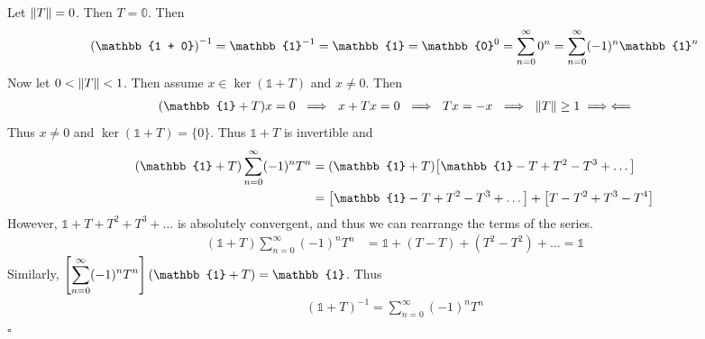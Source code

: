 \documentclass[12pt]{article}
\theoremstyle{plain}
\begin{document}
Let $\norm{T} = 0$.  Then $T = \mathbb{0}$.  Then
\begin{align*}
    \qty(\mathbb{1 + 0})^{-1} = \mathbb{1}^{-1} = \mathbb{1} = \mathbb{0}^0 = \sum_{n=0}^{\infty}0^n = \sum_{n=0}^\infty (-1)^n\mathbb{1}^n
\end{align*}
Now let $0 < \norm{T} < 1$.  Then assume $x \in \ker(\mathbb{1} + T)$ and $x \neq 0$.  Then
\begin{align*}
    (\mathbb{1} + T)x = 0\ \implies\ x + Tx = 0\ \implies\ Tx = -x\ \implies\ \norm{T} \geq 1 \implies\Longleftarrow
\end{align*}
Thus $x \neq 0$ and $\ker(\mathbb{1} + T) = \{0\}$.  Thus $\mathbb{1} + T$ is invertible and
\begin{align*}
    (\mathbb{1} + T)\sum_{n=0}^\infty(-1)^nT^n &= (\mathbb{1} + T)\qty[\mathbb{1} - T + T^2 - T^3 + \dots] \\
    &= \qty[\mathbb{1} - T + T^2 - T^3 + \dots ] + \qty[T - T^2 + T^3 - T^4]
\end{align*}
However, $\mathbb{1} + T + T^2 + T^3 + \dots$ is absolutely convergent, and thus we can rearrange the terms of the series.
\begin{align*}
    (\mathbb{1} + T)\sum_{n=0}^\infty(-1)^nT^n &= \mathbb{1} + (T - T) + (T^2 - T^2) + \dots = \mathbb{1}
\end{align*}
Similarly, $\qty[\displaystyle\sum_{n=0}^\infty(-1)^nT^n](\mathbb{1} + T) = \mathbb{1}$.  Thus
\begin{align*}
    (\mathbb{1} + T)^{-1} = \sum_{n=0}^\infty (-1)^nT^n
\end{align*}
\hfill $\square$
\end{document}

